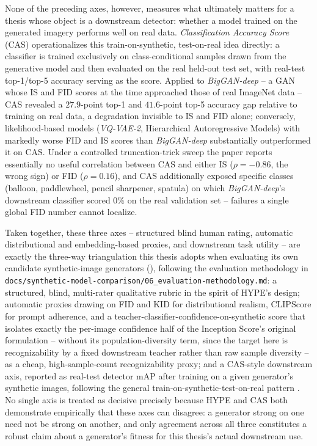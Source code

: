 None of the preceding axes, however, measures what ultimately matters for a thesis whose object is a downstream detector: whether a model trained on the generated imagery performs well on real data. \textit{Classification Accuracy Score} (CAS) \cite{ravuriClassificationAccuracyScore2019} operationalizes this train-on-synthetic, test-on-real idea directly: a classifier is trained exclusively on class-conditional samples drawn from the generative model and then evaluated on the real held-out test set, with real-test top-1/top-5 accuracy serving as the score. Applied to \textit{BigGAN-deep} -- a GAN whose IS and FID scores at the time approached those of real ImageNet data -- CAS revealed a $27.9$-point top-1 and $41.6$-point top-5 accuracy gap relative to training on real data, a degradation invisible to IS and FID alone; conversely, likelihood-based models (\textit{VQ-VAE-2}, Hierarchical Autoregressive Models) with markedly worse FID and IS scores than \textit{BigGAN-deep} substantially outperformed it on CAS. Under a controlled truncation-trick sweep the paper reports essentially no useful correlation between CAS and either IS ($\rho=-0.86$, the wrong sign) or FID ($\rho=0.16$), and CAS additionally exposed specific classes (balloon, paddlewheel, pencil sharpener, spatula) on which \textit{BigGAN-deep}'s downstream classifier scored $0\%$ on the real validation set -- failures a single global FID number cannot localize.

Taken together, these three axes -- structured blind human rating, automatic distributional and embedding-based proxies, and downstream task utility -- are exactly the three-way triangulation this thesis adopts when evaluating its own candidate synthetic-image generators (), following the evaluation methodology in \texttt{docs/synthetic-model-comparison/06\_evaluation-methodology.md}: a structured, blind, multi-rater qualitative rubric in the spirit of HYPE's design; automatic proxies drawing on FID and KID for distributional realism, CLIPScore for prompt adherence, and a teacher-classifier-confidence-on-synthetic score that isolates exactly the per-image confidence half of the Inception Score's original formulation \cite{salimansImprovedTechniquesTraining2016} -- without its population-diversity term, since the target here is recognizability by a fixed downstream teacher rather than raw sample diversity -- as a cheap, high-sample-count recognizability proxy; and a CAS-style downstream axis, reported as real-test detector mAP after training on a given generator's synthetic images, following the general train-on-synthetic-test-on-real pattern \cite{ravuriClassificationAccuracyScore2019}. No single axis is treated as decisive precisely because HYPE and CAS both demonstrate empirically that these axes can disagree: a generator strong on one need not be strong on another, and only agreement across all three constitutes a robust claim about a generator's fitness for this thesis's actual downstream use.

